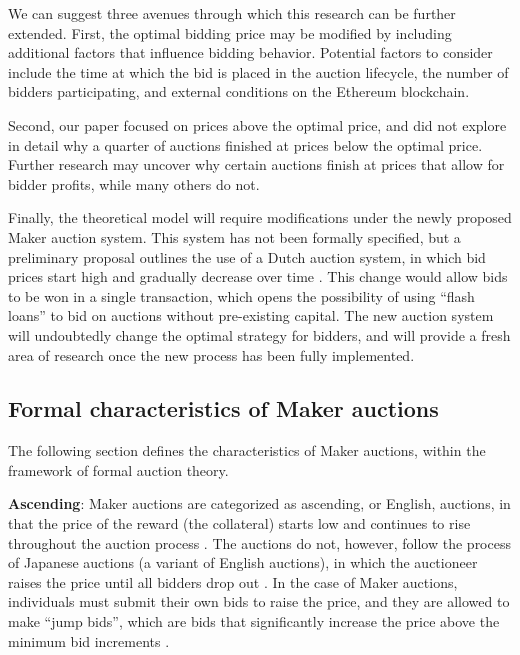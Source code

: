 \documentclass[conference]{IEEEtran}
\begin{document}
We can suggest three avenues through which this research can be further extended. First, the optimal bidding price may be modified by including additional factors that influence bidding behavior. Potential factors to consider include the time at which the bid is placed in the auction lifecycle, the number of bidders participating, and external conditions on the Ethereum blockchain.

Second, our paper focused on prices above the optimal price, and did not explore in detail why a quarter of auctions finished at prices below the optimal price. Further research may uncover why certain auctions finish at prices that allow for bidder profits, while many others do not.

Finally, the theoretical model will require modifications under the newly proposed Maker auction system. This system has not been formally specified, but a preliminary proposal outlines the use of a Dutch auction system, in which bid prices start high and gradually decrease over time \cite{systemRedesign}. This change would allow bids to be won in a single transaction, which opens the possibility of using ``flash loans'' to bid on auctions without pre-existing capital. The new auction system will undoubtedly change the optimal strategy for bidders, and will provide a fresh area of research once the new process has been fully implemented.

 


\appendix
\subsection{Formal characteristics of Maker auctions}
\label{section:characteristics}
The following section defines the characteristics of Maker auctions, within the framework of formal auction theory.

\textbf{Ascending}: Maker auctions are categorized as ascending, or English, auctions, in that the price of the reward (the collateral) starts low and continues to rise throughout the auction process \cite[p. 11]{auctionTheory.Klemperer}. The auctions do not, however, follow the process of Japanese auctions (a variant of English auctions), in which the auctioneer raises the price until all bidders drop out \cite[p. 187]{auctionTheory.Milgrom}. In the case of Maker auctions, individuals must submit their own bids to raise the price, and they are allowed to make ``jump bids'', which are bids that significantly increase the price above the minimum bid increments \cite[p. 11]{auctionTheory.Klemperer}.
\end{document}
